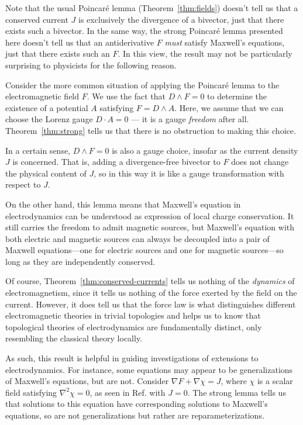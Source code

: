 \documentclass[twocolumn,notitlepage,nofootinbib,tightenlines]{revtex4-1}
\theoremstyle{definition}
\theoremstyle{remark}
\numberwithin{equation}{section}
\begin{document}
Note that the usual Poincar\'e lemma (Theorem~\ref{thm:fields}) doesn't tell us that a conserved current $J$ is exclusively the divergence of a bivector, just that there exists such a bivector. In the same way, the strong Poincar\'e lemma presented here doesn't tell us that an antiderivative $F$ \emph{must} satisfy Maxwell's equations, just that there exists such an $F$. In this view, the result may not be particularly surprising to physicists for the following reason.

Consider the more common situation of applying the Poincar\'e lemma to the electromagnetic field $F$. We use the fact that $D \wedge F = 0$ to determine the existence of a potential $A$ satisfying $F = D \wedge A$. Here, we assume that we can choose the Lorenz gauge $D \cdot A = 0$ --- it is a gauge \emph{freedom} after all. Theorem~\ref{thm:strong} tells us that there is no obstruction to making this choice.

In a certain sense, $D \wedge F = 0$ is also a gauge choice, insofar as the current density $J$ is concerned. That is, adding a divergence-free bivector to $F$ does not change the physical content of $J$, so in this way it is like a gauge transformation with respect to $J$.

On the other hand, this lemma means that Maxwell's equation in electrodynamics can be understood as expression of local charge conservation. It still carries the freedom to admit magnetic sources, but Maxwell's equation with both electric and magnetic sources can always be decoupled into a pair of Maxwell equations---one for electric sources and one for magnetic sources---so long as they are independently conserved.

Of course, Theorem~\ref{thm:conserved-currents} tells us nothing of the \emph{dynamics} of electromagnetism, since it tells us nothing of the force exerted by the field on the current. However, it does tell us that the force law is what distinguishes different electromagnetic theories in trivial topologies and helps us to know that topological theories of electrodynamics are fundamentally distinct, only resembling the classical theory locally.

As such, this result is helpful in guiding investigations of extensions to electrodynamics. For instance, some equations may appear to be generalizations of Maxwell's equations, but are not. Consider $\nabla F + \nabla \chi = J$, where $\chi$ is a scalar field satisfying $\nabla^2 \chi = 0$, as seen in Ref. \cite{dvoe} with $J=0$. The strong lemma tells us that solutions to this equation have corresponding solutions to Maxwell's equations, so are not generalizations but rather are reparameterizations.
\end{document}
